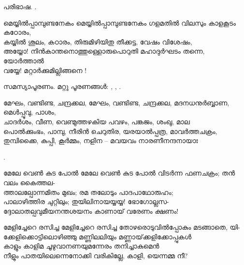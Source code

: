 \begin{enumerate}

പരിഭാഷ.  .

\begin{slokam}{\VSr}{\Naduv}{മെയ്യിൽപ്പാമ്പുണ്ടനേകം}
മെയ്യിൽപ്പാമ്പുണ്ടനേകം ഗളമതിൽ വിലസും കാളകൂടം കഠോരം,\\
കയ്യിൽ ശൂലം, കഠാരം, തിരുമിഴിയിതു തീക്കട്ട, വേഷം വിശേഷം,\\
അയ്യോ! നിൻകാന്തനൊത്തുള്ളൊരുപൊറുതി മഹാദുർഘടം തന്നെ, യോർത്താൽ\\
വയ്യേ! മറ്റാർക്കുമില്ലിങ്ങനെ !
\end{slokam}



സമസ്യാപൂരണം. മറ്റു പൂരണങ്ങൾ: , , .



\begin{slokam}{\VSr}{\Unk}{മേഘം, വണ്ടിണ്ട, ചന്ദ്രക്കല,}
 മേഘം, വണ്ടിണ്ട, ചന്ദ്രക്കല, മദനധനുർബ്ബാണ, മെള്‍പ്പൂവു, പാശം,\\
ചാദർശം, വീണ, വെണ്മുത്തഴകിയ പവഴം, പങ്കജം, ശംഖു, മാല\\
പൊൽക്കുംഭം, പാമ്പു, നീരിൻ ചെറുതിര, യരയാൽപ്പത്ര, മാവർത്തചക്രം,\\
തുമ്പിക്കൈ, കുപ്പി, കൂർമ്മം, നളിന -- മവയവം നാരണീനന്ദനായാഃ
\end{slokam}


.

\begin{slokam}{\VSv}{\NKD}{മേലേ വെൺ കുട പോൽ}
മേലേ വെൺ കുട പോൽ വിടർന്ന ഫണചക്രം; തൻ വലം കൈത്തല- \\
ത്താലല്പോന്നമിതം മുഖം; രമ തലോടും പാദപാഥോരുഹം;\\
പാലാഴിത്തിര ചുറ്റിലും; തുയിലിനായയ്യയ്യ! ഭോഗോല്ലസ-\\
ദ്ദോലാതല്പവുമീയനന്തശയനം കാണായ് വരേണം ക്ഷണം! 
\end{slokam}


\begin{slokam}{\VSv}{\RV}{മേളിച്ചേറെ രസിച്ച}
മേളിച്ചേറെ രസിച്ച തോഴരൊടുവിൽപ്പോകും മടങ്ങാതെ, യി-\\
ക്കേളിക്കൊട്ടിലൊഴിഞ്ഞു മണ്ണിലലിയും മണ്ണായ്‌ക്കളിക്കോപ്പുകള്‍\\
കാളും കാളിമ ചൂഴുവാനണയുമന്നേരം തനിച്ചാകുമെൻ\\
നീളും പാതയിലെന്നെനോക്കി വരികില്ലേ, കാളി, യെന്നമ്മ നീ? 
\end{slokam}


\end{enumerate}


